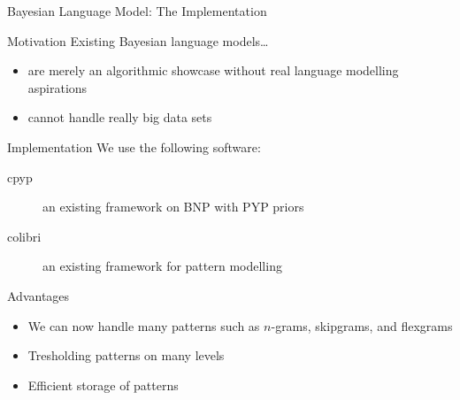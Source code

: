 \begin{frame}{Bayesian Language Model: The Implementation}
    \begin{block}{Motivation}
        Existing Bayesian language models\ldots
        \begin{itemize}
            \item are merely an algorithmic showcase without real language modelling aspirations
            \item cannot handle really big data sets
        \end{itemize}
    \end{block}

    \begin{block}{Implementation}
        We use the following software:
        \begin{description}
            \item[cpyp] an existing \CC{} framework on BNP with PYP priors
            \item[colibri] an existing \CC{} framework for pattern modelling
        \end{description}
    \end{block}

    \begin{block}{Advantages}
        \begin{itemize}
            \item We can now handle many patterns such as $n$-grams, skipgrams, and flexgrams
            \item Tresholding patterns on many levels
            \item Efficient storage of patterns
        \end{itemize}
    \end{block}
\end{frame}
\note[itemize]{
}


